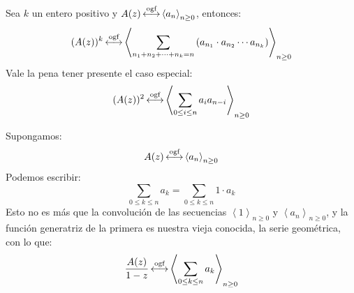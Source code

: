 \begin{description}
  \item
    Sea \(k\) un entero positivo
    y \(A(z) \operatorname{\stackrel{\text{ogf}}{\longleftrightarrow}} \left\langle a_n\right\rangle_{n \ge 0}\),
    entonces:
    \begin{equation*}
      (A(z))^k
	\operatorname{\stackrel{\text{ogf}}{\longleftrightarrow}} \left\langle \sum_{n_1 + n_2 + \dotsb + n_k = n}
	       \left( a_{n_1} \cdot a_{n_2} \dotsm a_{n_k} \right)
	     \right\rangle_{n \ge 0}
    \end{equation*}
    Vale la pena tener presente el caso especial:
    \begin{equation*}
      (A(z))^2
	\operatorname{\stackrel{\text{ogf}}{\longleftrightarrow}} \left\langle
	       \sum_{0 \le i \le n} a_i a_{n - i}
	     \right\rangle_{n \ge 0}
    \end{equation*}
  \item[Sumas parciales:]
    Supongamos:
    \begin{equation*}
      A(z) \operatorname{\stackrel{\text{ogf}}{\longleftrightarrow}} \left\langle a_n \right\rangle_{n \ge 0}
    \end{equation*}
    Podemos escribir:
    \begin{equation*}
      \sum_{0 \le k \le n} a_k
	= \sum_{0 \le k \le n} 1 \cdot a_k
    \end{equation*}
    Esto no es más que la convolución de las secuencias
    \(\left\langle 1 \right\rangle_{n \ge 0}\)
    y \(\left\langle a_n \right\rangle_{n \ge 0}\),
    y la función generatriz de la primera es nuestra vieja conocida,
    la serie geométrica,
    con lo que:
    \begin{equation}
      \label{eq:sumas-parciales}
      \frac{A(z)}{1 - z}
	\operatorname{\stackrel{\text{ogf}}{\longleftrightarrow}} \left\langle
	       \sum_{0 \le k \le n} a_k
	     \right\rangle_{n \ge 0}
    \end{equation}
  \end{description}

